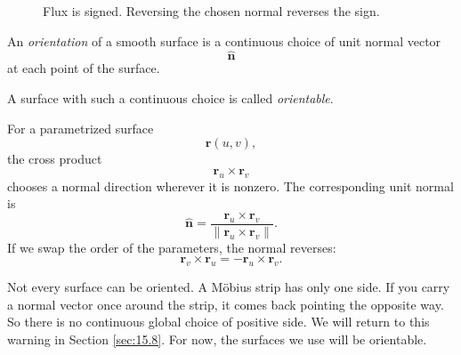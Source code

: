 \begin{figure}[h]
\centering
{}
\caption{Flux is signed.  Reversing the chosen normal reverses the sign.}
\end{figure}

\begin{definition}
An \emph{orientation} of a smooth surface is a continuous choice of unit normal vector
\[
    \widehat{\mathbf n}
\]
at each point of the surface.

A surface with such a continuous choice is called \emph{orientable}.
\end{definition}

For a parametrized surface
\[
    \mathbf r(u,v),
\]
the cross product
\[
    \mathbf r_u\times\mathbf r_v
\]
chooses a normal direction wherever it is nonzero.  The corresponding unit normal is
\[
\boxed{
    \widehat{\mathbf n}
    =
    \frac{\mathbf r_u\times\mathbf r_v}
    {\|\mathbf r_u\times\mathbf r_v\|}.
}
\]
If we swap the order of the parameters, the normal reverses:
\[
    \mathbf r_v\times\mathbf r_u
    =
    -\mathbf r_u\times\mathbf r_v.
\]

Not every surface can be oriented.  A M\"obius strip has only one side.  If you carry a
normal vector once around the strip, it comes back pointing the opposite way.  So there
is no continuous global choice of positive side.  We will return to this warning in
Section \ref{sec:15.8}.  For now, the surfaces we use will be orientable.

